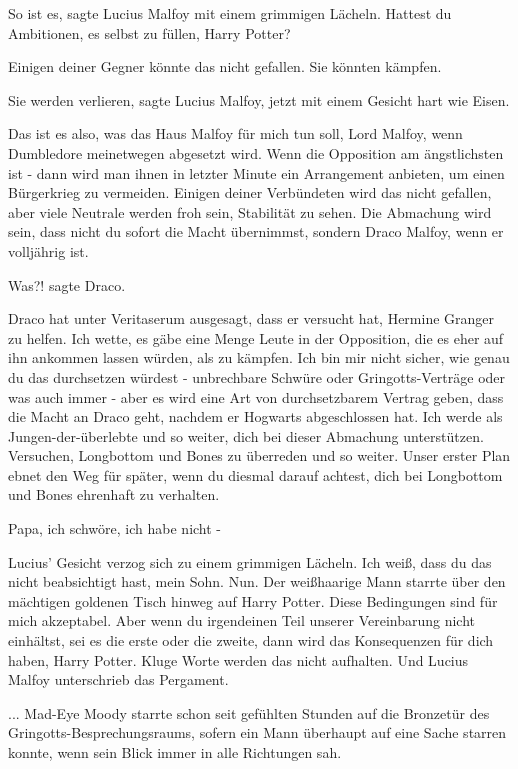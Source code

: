 \glqq{}So ist es\grqq{}, sagte Lucius Malfoy mit einem grimmigen Lächeln. \glqq{}
Hattest du Ambitionen, es selbst zu füllen, Harry Potter?\grqq{}

\glqq{}Einigen deiner Gegner könnte das nicht gefallen. Sie könnten
kämpfen.\grqq{}

\glqq{}Sie werden verlieren\grqq{}, sagte Lucius Malfoy, jetzt mit einem Gesicht
hart wie Eisen.

\glqq{}Das ist es also, was das Haus Malfoy für mich tun soll, Lord Malfoy, wenn
Dumbledore meinetwegen abgesetzt wird. Wenn die Opposition am ängstlichsten ist
- dann wird man ihnen in letzter Minute ein Arrangement anbieten, um einen
Bürgerkrieg zu vermeiden. Einigen deiner Verbündeten wird das nicht gefallen,
aber viele Neutrale werden froh sein, Stabilität zu sehen. Die Abmachung wird
sein, dass nicht du sofort die Macht übernimmst, sondern Draco Malfoy, wenn er
volljährig ist.\grqq{}

\glqq{}Was?!\grqq{} sagte Draco.

\glqq{}Draco hat unter Veritaserum ausgesagt, dass er versucht hat, Hermine
Granger zu helfen. Ich wette, es gäbe eine Menge Leute in der Opposition, die es
eher auf ihn ankommen lassen würden, als zu kämpfen. Ich bin mir nicht sicher,
wie genau du das durchsetzen würdest - unbrechbare Schwüre oder
Gringotts-Verträge oder was auch immer - aber es wird eine Art von
durchsetzbarem Vertrag geben, dass die Macht an Draco geht, nachdem er Hogwarts
abgeschlossen hat. Ich werde als Jungen-der-überlebte und so weiter, dich bei
dieser Abmachung unterstützen. Versuchen, Longbottom und Bones zu überreden und
so weiter. Unser erster Plan ebnet den Weg für später, wenn du diesmal darauf
achtest, dich bei Longbottom und Bones ehrenhaft zu verhalten.\grqq{}

\glqq{}Papa, ich schwöre, ich habe nicht -\grqq{}

Lucius' Gesicht verzog sich zu einem grimmigen Lächeln. \glqq{}Ich weiß, dass du
das nicht beabsichtigt hast, mein Sohn. Nun.\grqq{} Der weißhaarige Mann starrte
über den mächtigen goldenen Tisch hinweg auf Harry Potter. \glqq{}Diese
Bedingungen sind für mich akzeptabel. Aber wenn du irgendeinen Teil unserer
Vereinbarung nicht einhältst, sei es die erste oder die zweite, dann wird das
Konsequenzen für dich haben, Harry Potter. Kluge Worte werden das nicht
aufhalten.\grqq{} Und Lucius Malfoy unterschrieb das Pergament.

... Mad-Eye Moody starrte schon seit gefühlten Stunden auf die Bronzetür des
Gringotts-Besprechungsraums, sofern ein Mann überhaupt auf eine Sache starren
konnte, wenn sein Blick immer in alle Richtungen sah.

